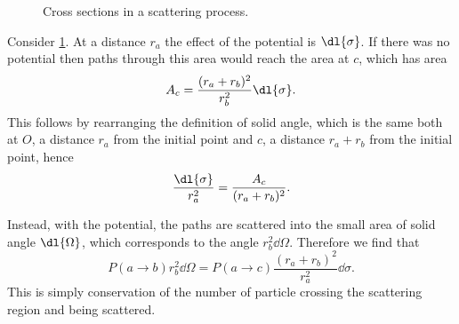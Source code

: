 \documentclass[fleqn]{NotesClass}
\begin{document}
    \begin{figure}
        \caption{Cross sections in a scattering process.}
        \label{fig:scattering cross sections}
    \end{figure}

    Consider \cref{fig:scattering cross sections}.
    At a distance \(r_a\) the effect of the potential is \(\dl{\sigma}\).
    If there was no potential then paths through this area would reach the area at \(c\), which has area
    \begin{equation}
        A_c = \frac{(r_a + r_b)^2}{r_b^2}\dl{\sigma}.
    \end{equation}
    This follows by rearranging the definition of solid angle, which is the same both at \(O\), a distance \(r_a\) from the initial point and \(c\), a distance \(r_a + r_b\) from the initial point, hence
    \begin{equation}
        \frac{\dl{\sigma}}{r_a^2} = \frac{A_c}{(r_a + r_b)^2}.
    \end{equation}
    
    Instead, with the potential, the paths are scattered into the small area of solid angle \(\dl{\Omega}\), which corresponds to the angle \(r_b^2\dd{\Omega}\).
    Therefore we find that
    \begin{equation}
        P(a \to b) r_b^2\dd{\Omega} = P(a \to c) \frac{(r_a + r_b)^2}{r_a^2} \dd{\sigma}.
    \end{equation}
    This is simply conservation of the number of particle crossing the scattering region and being scattered.
    
\end{document}
